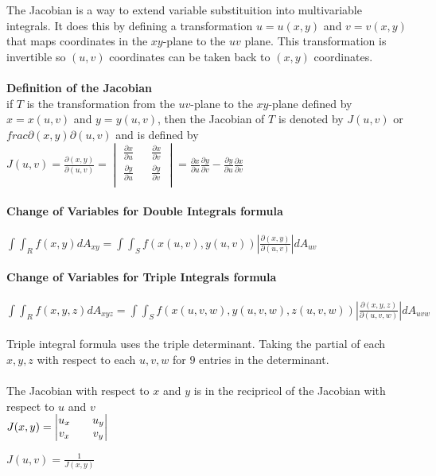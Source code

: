 \documentclass[14pt]{extreport}
\begin{document}
The Jacobian is a way to extend variable substituition into multivariable integrals. It does this by defining a transformation $u = u(x,y)$ and $v = v(x,y)$ that maps coordinates in the $xy$-plane
to the $uv$ plane. This transformation is invertible so $(u,v)$ coordinates can be taken back to $(x,y)$ coordinates.\\\\

\textbf{Definition of the Jacobian}\\

if $T$ is the transformation from the $uv$-plane to the $xy$-plane defined by $x=x(u, v)$ and $y = y(u, v)$, then the Jacobian of $T$ is denoted by $J(u, v)$ or $frac{\partial(x,y)}{\partial(u, v)}$ and is defined by\\

$J(u, v) = \frac{\partial(x,y)}{\partial(u, v)} = \begin{vmatrix} \frac{\partial x}{\partial u} &&  \frac{\partial x}{\partial v} \\ \frac{\partial y}{\partial u} &&  \frac{\partial y}{\partial v}\\ \end{vmatrix} = \frac{\partial x}{\partial u}\frac{\partial y}{\partial v} -  \frac{\partial y}{\partial u}\frac{\partial x}{\partial v}$\\\\


\textbf{Change of Variables for Double Integrals formula}\\\\ $\int\int_R f(x,y)dA_{xy} = \int\int_S f(x(u,v), y(u,v)) |\frac{\partial(x,y)}{\partial(u,v)}|dA_{uv}$\\\\


\textbf{Change of Variables for Triple Integrals formula}\\\\ $\int\int_R f(x,y, z)dA_{xyz} = \int\int_S f(x(u,v, w), y(u,v, w), z(u, v, w)) |\frac{\partial(x,y, z)}{\partial(u,v, w)}|dA_{uvw}$\\\\

Triple integral formula uses the triple determinant. Taking the partial of each $x, y, z$ with respect to each $u, v, w$ for $9$ entries in the determinant.\\\\

The Jacobian with respect to $x$ and $y$ is in the recipricol of the Jacobian with respect to $u$ and $v$\\

$J(x,y) = \begin{vmatrix}
	u_x && u_y \\
	v_x && v_y \\
\end{vmatrix}\\$

$J(u, v) = \frac{1}{J(x,y)}$
\end{document}
